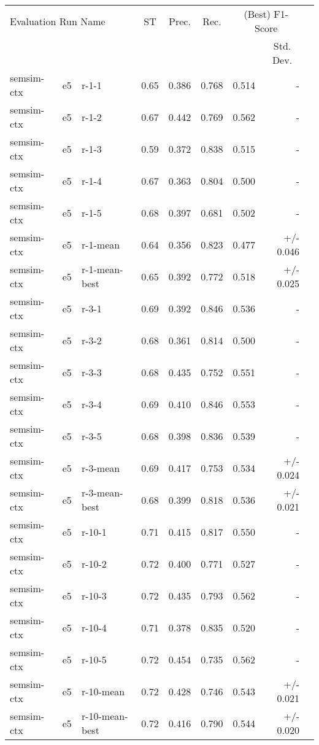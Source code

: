 \begin{table}[H]
\centering
\begin{tabular}{lllrrrrrr}
\toprule
\multicolumn{3}{l}{Evaluation Run Name}	& \multicolumn{1}{c}{ST} & \multicolumn{1}{c}{Prec.} & \multicolumn{1}{c}{Rec.} & \multicolumn{2}{c}{(Best) F1-Score}\\
\cmidrule{7-8}
\multicolumn{7}{l}{} & \multicolumn{1}{c}{Std. Dev.} \\
\midrule
semsim-ctx & e5 & r-1-1 & 0.65 & 0.386 & 0.768 & 0.514 & - \\
semsim-ctx & e5 & r-1-2 & 0.67 & 0.442 & 0.769 & 0.562 & - \\
semsim-ctx & e5 & r-1-3 & 0.59 & 0.372 & 0.838 & 0.515 & - \\
semsim-ctx & e5 & r-1-4 & 0.67 & 0.363 & 0.804 & 0.500 & - \\
semsim-ctx & e5 & r-1-5 & 0.68 & 0.397 & 0.681 & 0.502 & - \\
semsim-ctx & e5 & r-1-mean & 0.64 & 0.356 & 0.823 & 0.477 & +/- 0.046 \\
semsim-ctx & e5 & r-1-mean-best & 0.65 & 0.392 & 0.772 & 0.518 & +/- 0.025 \\
\hline
semsim-ctx & e5 & r-3-1 & 0.69 & 0.392 & 0.846 & 0.536 & - \\
semsim-ctx & e5 & r-3-2 & 0.68 & 0.361 & 0.814 & 0.500 & - \\
semsim-ctx & e5 & r-3-3 & 0.68 & 0.435 & 0.752 & 0.551 & - \\
semsim-ctx & e5 & r-3-4 & 0.69 & 0.410 & 0.846 & 0.553 & - \\
semsim-ctx & e5 & r-3-5 & 0.68 & 0.398 & 0.836 & 0.539 & - \\
semsim-ctx & e5 & r-3-mean & 0.69 & 0.417 & 0.753 & 0.534 & +/- 0.024 \\
semsim-ctx & e5 & r-3-mean-best & 0.68 & 0.399 & 0.818 & 0.536 & +/- 0.021 \\
\hline
semsim-ctx & e5 & r-10-1 & 0.71 & 0.415 & 0.817 & 0.550 & - \\
semsim-ctx & e5 & r-10-2 & 0.72 & 0.400 & 0.771 & 0.527 & - \\
semsim-ctx & e5 & r-10-3 & 0.72 & 0.435 & 0.793 & 0.562 & - \\
semsim-ctx & e5 & r-10-4 & 0.71 & 0.378 & 0.835 & 0.520 & - \\
semsim-ctx & e5 & r-10-5 & 0.72 & 0.454 & 0.735 & 0.562 & - \\
semsim-ctx & e5 & r-10-mean & 0.72 & 0.428 & 0.746 & 0.543 & +/- 0.021 \\
semsim-ctx & e5 & r-10-mean-best & 0.72 & 0.416 & 0.790 & 0.544 & +/- 0.020 \\

\end{tabular}
\end{table}
